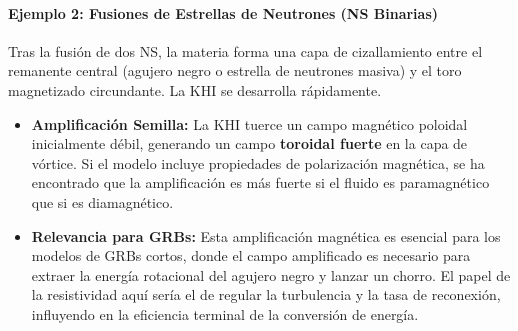 \paragraph{Ejemplo 2: Fusiones de Estrellas de Neutrones (NS Binarias)}
Tras la fusión de dos NS, la materia forma una capa de cizallamiento entre el remanente central (agujero negro o estrella de neutrones masiva) y el toro magnetizado circundante. La KHI se desarrolla rápidamente.
\begin{itemize}
    \item \textbf{Amplificación Semilla:} La KHI tuerce un campo magnético poloidal inicialmente débil, generando un campo \textbf{toroidal fuerte} en la capa de vórtice. Si el modelo incluye propiedades de polarización magnética, se ha encontrado que la amplificación es más fuerte si el fluido es paramagnético que si es diamagnético.
    \item \textbf{Relevancia para GRBs:} Esta amplificación magnética es esencial para los modelos de GRBs cortos, donde el campo amplificado es necesario para extraer la energía rotacional del agujero negro y lanzar un chorro. El papel de la resistividad aquí sería el de regular la turbulencia y la tasa de reconexión, influyendo en la eficiencia terminal de la conversión de energía.
\end{itemize}

